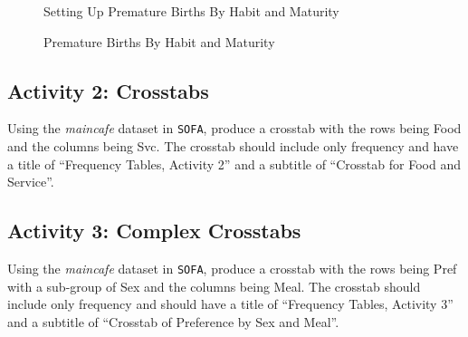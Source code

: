\begin{figure}[H]
  \begin{center}
    \caption{Setting Up Premature Births By Habit and Maturity}
  \end{center}
\end{figure}

\begin{figure}[H]
  \begin{center}
    \caption{Premature Births By Habit and Maturity}
  \end{center}
\end{figure}

\subsection{Activity 2: Crosstabs} \label{fre:act02}

Using the \textit{maincafe} dataset in \texttt{SOFA}, produce a crosstab with the rows being Food and the columns being Svc. The crosstab should include only frequency and have a title of ``Frequency Tables, Activity 2'' and a subtitle of ``Crosstab for Food and Service''.

\subsection{Activity 3: Complex Crosstabs} \label{fre:act03}

Using the \textit{maincafe} dataset in \texttt{SOFA}, produce a crosstab with the rows being Pref with a sub-group of Sex and the columns being Meal. The crosstab should include only frequency and should have a title of ``Frequency Tables, Activity 3'' and a subtitle of ``Crosstab of Preference by Sex and Meal''.

